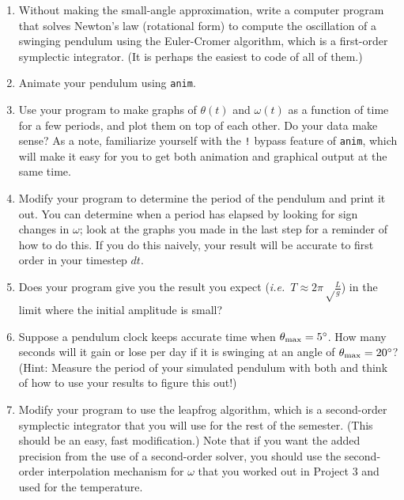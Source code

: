 \documentclass[12pt]{article}
\newcommand{\ie}{{\em i.e.\ }}
\begin{document}
\begin{enumerate}

\item Without making the small-angle approximation, 
write a computer program that solves Newton's law (rotational form) to compute the oscillation of a swinging pendulum using the Euler-Cromer algorithm, which 
is a first-order symplectic integrator. (It is perhaps the easiest to code of all of them.)

\item Animate your pendulum using {\tt anim}.

\item Use your program to make graphs of $\theta(t)$ and $\omega(t)$ as a function of time for a few periods, and plot them on top of each other. Do your 
data make sense? As a note, familiarize yourself with the {\tt !} bypass feature of {\tt anim}, which will make it easy for you to get both animation and graphical
output at the same time.

\item Modify your program to determine the period of the pendulum and print it out. You can determine when a period has elapsed by looking for sign changes in $\omega$; look at the graphs you 
made in the last step for a reminder of how to do this. If you do this naively, your result will be accurate to first order in your timestep $dt$.

\item Does your program give you the result you expect (\ie $T \approx 2\pi\sqrt\frac{L}{g}$) in the limit where the initial amplitude is small?

\item Suppose a pendulum clock keeps accurate time when $\theta_{\rm max}=5^\circ$. How many seconds will it gain or lose per day if it is swinging at an angle of  $\theta_{\rm max}=20^\circ$? (Hint: Measure the period of your 
simulated pendulum with both and think of how to use your results to figure this out!)

\item Modify your program to use the leapfrog algorithm, which is a second-order symplectic integrator that you will use for the rest of the semester. (This should be an easy, fast modification.) Note that if you want the added precision from the
use of a second-order solver, you should use the second-order interpolation mechanism for $\omega$ that you worked out in Project 3 and used for the temperature.


\end{enumerate}
\end{document}

